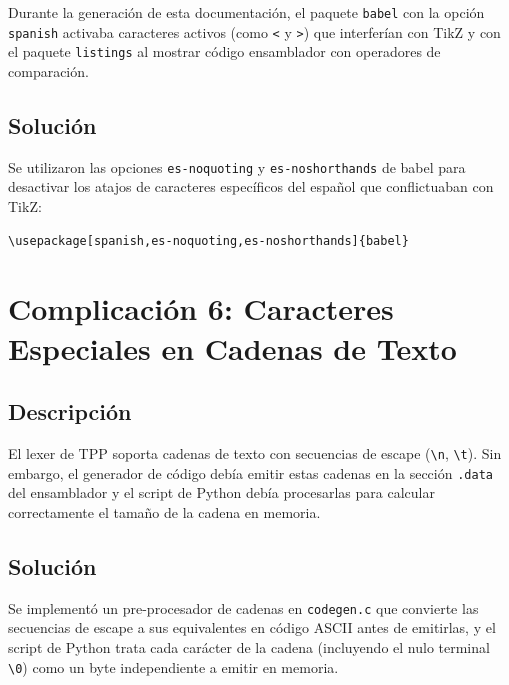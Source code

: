 Durante la generación de esta documentación, el paquete \texttt{babel} con la opción \texttt{spanish} activaba caracteres activos (como \texttt{<} y \texttt{>}) que interferían con TikZ y con el paquete \texttt{listings} al mostrar código ensamblador con operadores de comparación.

\subsection{Solución}

Se utilizaron las opciones \texttt{es-noquoting} y \texttt{es-noshorthands} de babel para desactivar los atajos de caracteres específicos del español que conflictuaban con TikZ:

\begin{lstlisting}[caption={Configuración Babel para compatibilidad con TikZ}]
\usepackage[spanish,es-noquoting,es-noshorthands]{babel}
\end{lstlisting}

\section{Complicación 6: Caracteres Especiales en Cadenas de Texto}

\subsection{Descripción}

El lexer de TPP soporta cadenas de texto con secuencias de escape (\texttt{\textbackslash n}, \texttt{\textbackslash t}). Sin embargo, el generador de código debía emitir estas cadenas en la sección \texttt{.data} del ensamblador y el script de Python debía procesarlas para calcular correctamente el tamaño de la cadena en memoria.

\subsection{Solución}

Se implementó un pre-procesador de cadenas en \texttt{codegen.c} que convierte las secuencias de escape a sus equivalentes en código ASCII antes de emitirlas, y el script de Python trata cada carácter de la cadena (incluyendo el nulo terminal \texttt{\textbackslash 0}) como un byte independiente a emitir en memoria.
